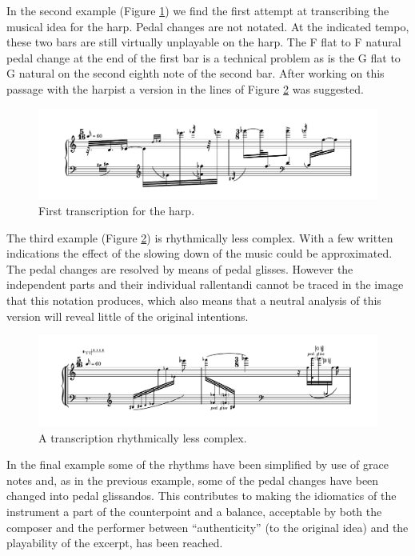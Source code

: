 \documentclass[10pt,letterpaper]{article}
\begin{document}
In the second example (Figure \ref{harpex2}) we find the first attempt
at transcribing the musical idea for the harp. Pedal changes are not
notated. At the indicated tempo, these two bars are still virtually
unplayable on the harp. The F flat to F natural pedal change at the end
of the first bar is a technical problem as is the G flat to G natural on
the second eighth note of the second bar. After working on this passage
with the harpist a version in the lines of Figure \ref{harpex3} was
suggested.


\begin{figure}[!hbp]
\includegraphics[width=1.0\columnwidth]{img/harpVersion2}
\caption{First transcription for the harp.}
\label{harpex2}
\end{figure}

The third example (Figure \ref{harpex3}) is rhythmically less
complex. With a few written indications the effect of the slowing down
of the music could be approximated. The pedal changes are resolved by
means of pedal glisses. However the independent parts and their
individual rallentandi cannot be traced in the image that this notation
produces, which also means that a neutral analysis of this version will
reveal little of the original intentions.

\begin{figure}[!ht]
\includegraphics[width=1.0\columnwidth]{img/harpVersion3}
\caption{A transcription rhythmically less complex.}
\label{harpex3}
\end{figure}

In the final example some of the rhythms have been simplified by use of
grace notes and, as in the previous example, some of the pedal changes
have been changed into pedal glissandos. This contributes to making the
idiomatics of the instrument a part of the counterpoint and a
balance, acceptable by both the composer and the performer between
``authenticity'' (to the original idea) and the playability of the
excerpt, has been reached.
\end{document}

